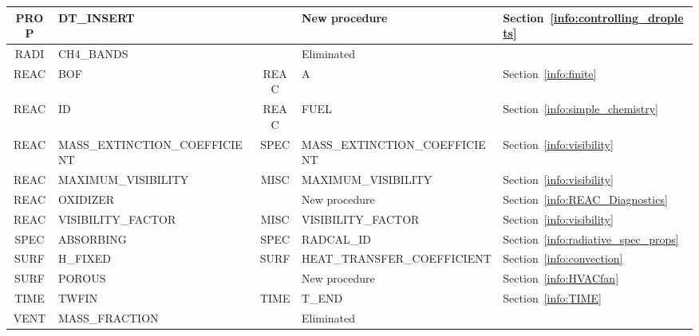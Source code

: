 \documentclass[11pt]{book}
\begin{document}
\begin{table}
\begin{tabular}{@{\extracolsep{\fill}}|c|l|c|l|l|}
{\ct PROP}    & {\ct DT\_INSERT}                    &              & New procedure                               & Section~\ref{info:controlling_droplets} \\ \hline
{\ct RADI}    & {\ct CH4\_BANDS}                    &              &  Eliminated                                 &                                      \\ \hline
{\ct REAC}    & {\ct BOF}                           &  {\ct REAC}  &  {\ct A}                                    & Section~\ref{info:finite}           \\ \hline
{\ct REAC}    & {\ct ID}                            &  {\ct REAC}  &  {\ct FUEL}                                 & Section~\ref{info:simple_chemistry}       \\ \hline
{\ct REAC}    & {\ct MASS\_EXTINCTION\_COEFFICIENT} &  {\ct SPEC}  &  {\ct MASS\_EXTINCTION\_COEFFICIENT}        & Section~\ref{info:visibility}       \\ \hline
{\ct REAC}    & {\ct MAXIMUM\_VISIBILITY}           &  {\ct MISC}  &  {\ct MAXIMUM\_VISIBILITY}                  & Section~\ref{info:visibility}       \\ \hline
{\ct REAC}    & {\ct OXIDIZER}                      &              & New procedure                               & Section~\ref{info:REAC_Diagnostics}          \\ \hline
{\ct REAC}    & {\ct VISIBILITY\_FACTOR}            &  {\ct MISC}  &  {\ct VISIBILITY\_FACTOR}                   & Section~\ref{info:visibility}       \\ \hline
{\ct SPEC}    & {\ct ABSORBING}                     &  {\ct SPEC}  &  {\ct RADCAL\_ID }                          & Section~\ref{info:radiative_spec_props}  \\ \hline
{\ct SURF}    & {\ct H\_FIXED}                      &  {\ct SURF}  & {\ct HEAT\_TRANSFER\_COEFFICIENT}           & Section~\ref{info:convection}                   \\ \hline
{\ct SURF}    & {\ct POROUS}                        &              & New procedure                               & Section~\ref{info:HVACfan}                   \\ \hline
{\ct TIME}    & {\ct TWFIN}                         &  {\ct TIME}  & {\ct T\_END}                                & Section~\ref{info:TIME}                  \\ \hline
{\ct VENT}    & {\ct MASS\_FRACTION}                &              & Eliminated                                  &                                              \\ \hline
\end{tabular}
\end{table}
\end{document}
